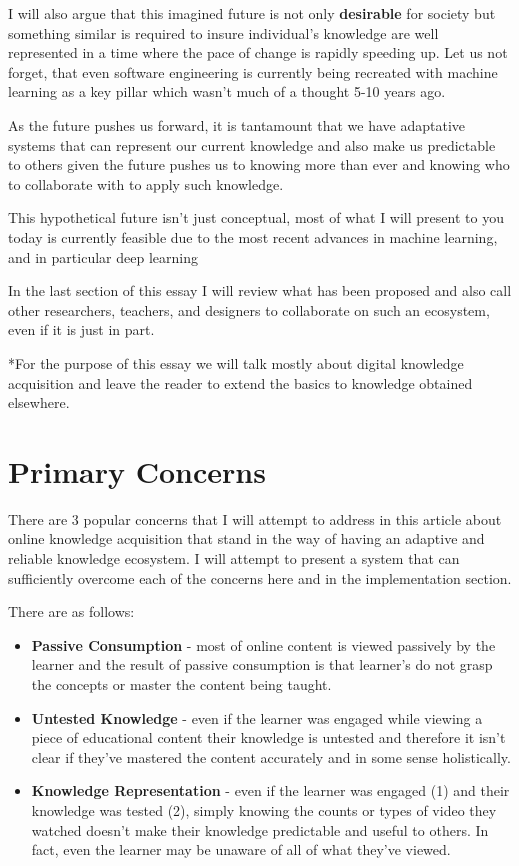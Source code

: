 \documentclass{acm_proc_article-sp}
\providecommand{\tightlist}{%
  \setlength{\itemsep}{0pt}\setlength{\parskip}{0pt}}
\begin{document}
I will also argue that this imagined future is not only
\textbf{desirable} for society but something similar is required to
insure individual's knowledge are well represented in a time where the
pace of change is rapidly speeding up. Let us not forget, that even
software engineering is currently being recreated with machine learning
as a key pillar which wasn't much of a thought 5-10 years ago.

As the future pushes us forward, it is tantamount that we have
adaptative systems that can represent our current knowledge and also
make us predictable to others given the future pushes us to knowing more
than ever and knowing who to collaborate with to apply such knowledge.

This hypothetical future isn't just conceptual, most of what I will
present to you today is currently feasible due to the most recent
advances in machine learning, and in particular deep learning

In the last section of this essay I will review what has been proposed
and also call other researchers, teachers, and designers to collaborate
on such an ecosystem, even if it is just in part.

*For the purpose of this essay we will talk mostly about digital
knowledge acquisition and leave the reader to extend the basics to
knowledge obtained elsewhere.

\section{Primary Concerns}\label{primary-concerns}

There are 3 popular concerns that I will attempt to address in this
article about online knowledge acquisition that stand in the way of
having an adaptive and reliable knowledge ecosystem. I will attempt to
present a system that can sufficiently overcome each of the concerns
here and in the implementation section.

There are as follows:

\begin{itemize}
\tightlist
\item
  \textbf{Passive Consumption} - most of online content is viewed
  passively by the learner and the result of passive consumption is that
  learner's do not grasp the concepts or master the content being
  taught.
\item
  \textbf{Untested Knowledge} - even if the learner was engaged while
  viewing a piece of educational content their knowledge is untested and
  therefore it isn't clear if they've mastered the content accurately
  and in some sense holistically.
\item
  \textbf{Knowledge Representation} - even if the learner was engaged
  (1) and their knowledge was tested (2), simply knowing the counts or
  types of video they watched doesn't make their knowledge predictable
  and useful to others. In fact, even the learner may be unaware of all
  of what they've viewed.
\end{itemize}
\end{document}
